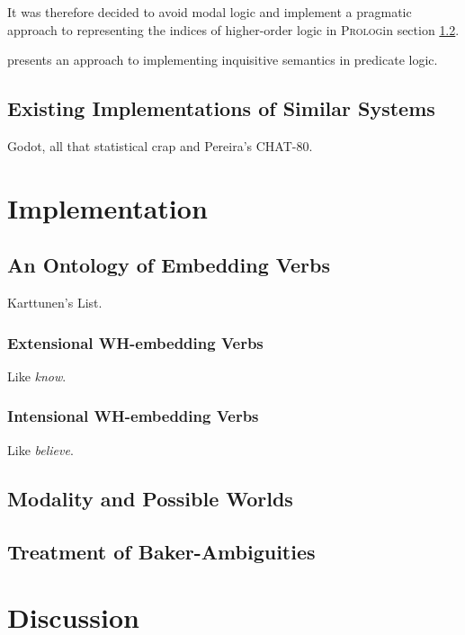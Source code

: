 \documentclass{scrartcl}
\newcommand{\pn}{\textsc}
\newcommand{\prol}{\pn{Prolog}}
\begin{document}
It was therefore decided to avoid modal logic and implement a pragmatic approach
to representing the indices of higher-order logic in \prol in section
\ref{sec:indices}.

\cite{g:inqs} presents an approach to implementing inquisitive semantics in
predicate logic.

\subsection{Existing Implementations of Similar Systems}\label{sec:othercrap}

Godot, all that statistical crap and Pereira's CHAT-80.

\section{Implementation}

\subsection{An Ontology of Embedding Verbs}

Karttunen's List.

\subsubsection{Extensional WH-embedding Verbs}

Like \emph{know}.

\subsubsection{Intensional WH-embedding Verbs}

Like \emph{believe}.

\subsection{Modality and Possible Worlds}
\label{sec:indices}
\subsection{Treatment of Baker-Ambiguities}

\section{Discussion}


\end{document}
